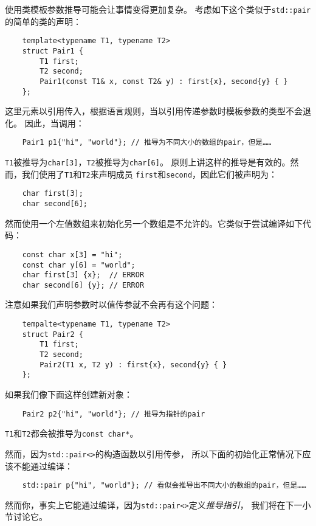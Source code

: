 使用类模板参数推导可能会让事情变得更加复杂。
考虑如下这个类似于\texttt{std::pair}的简单的类的声明：
\begin{lstlisting}
    template<typename T1, typename T2>
    struct Pair1 {
        T1 first;
        T2 second;
        Pair1(const T1& x, const T2& y) : first{x}, second{y} { }
    };
\end{lstlisting}
这里元素以引用传入，根据语言规则，当以引用传递参数时模板参数的类型不会退化。
因此，当调用：
\begin{lstlisting}
    Pair1 p1{"hi", "world"}; // 推导为不同大小的数组的pair，但是……
\end{lstlisting}
\texttt{T1}被推导为\texttt{char[3]}，\texttt{T2}被推导为\texttt{char[6]}。
原则上讲这样的推导是有效的。然而，我们使用了\texttt{T1}和\texttt{T2}来声明成员
\texttt{first}和\texttt{second}，因此它们被声明为：
\begin{lstlisting}
    char first[3];
    char second[6];
\end{lstlisting}
然而使用一个左值数组来初始化另一个数组是不允许的。它类似于尝试编译如下代码：
\begin{lstlisting}
    const char x[3] = "hi";
    const char y[6] = "world";
    char first[3] {x};  // ERROR
    char second[6] {y}; // ERROR
\end{lstlisting}
注意如果我们声明参数时以值传参就不会再有这个问题：
\begin{lstlisting}
    tempalte<typename T1, typename T2>
    struct Pair2 {
        T1 first;
        T2 second;
        Pair2(T1 x, T2 y) : first{x}, second{y} { }
    };
\end{lstlisting}
如果我们像下面这样创建新对象：
\begin{lstlisting}
    Pair2 p2{"hi", "world"}; // 推导为指针的pair
\end{lstlisting}
\texttt{T1}和\texttt{T2}都会被推导为\texttt{const char*}。

然而，因为\texttt{std::pair<>}的构造函数以引用传参，
所以下面的初始化正常情况下应该不能通过编译：
\begin{lstlisting}
    std::pair p{"hi", "world"}; // 看似会推导出不同大小的数组的pair，但是……
\end{lstlisting}
然而你，事实上它能通过编译，因为\texttt{std::pair<>}定义\emph{推导指引}，
我们将在下一小节讨论它。

